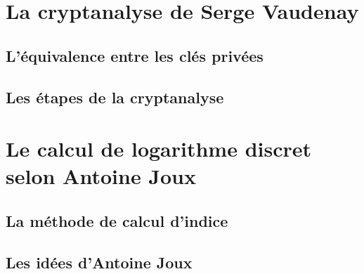 \documentclass{beamer}
\theoremstyle{definition}
\theoremstyle{remark}
\begin{document}
\section{La cryptanalyse de Serge Vaudenay}
\subsection{L'équivalence entre les clés privées}
\begin{frame}
	\frametitle{}
  	
\end{frame} 

\subsection{Les étapes de la cryptanalyse}
\begin{frame}
	\frametitle{}
  	
\end{frame} 

\section{Le calcul de logarithme discret selon Antoine Joux}
\subsection{La méthode de calcul d'indice}
\begin{frame}
	\frametitle{}
  	
\end{frame} 

\subsection{Les idées d'Antoine Joux}
\begin{frame}
	\frametitle{}
  	
\end{frame}
\end{document}
